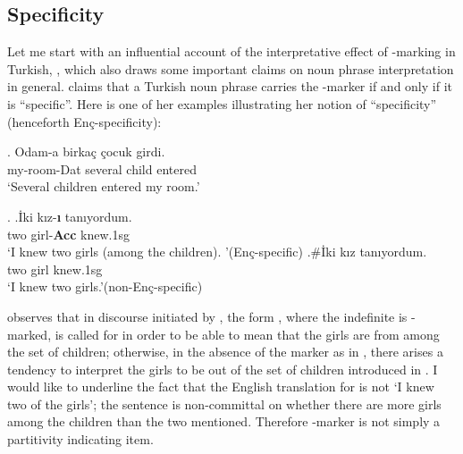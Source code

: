 \documentclass[11pt,a4paper]{article}
\newcommand{\encspec}{Enç-specific}
\begin{document}
\subsection{Specificity} %
\label{scenc}

Let me start with an influential account of the interpretative effect of \acc-marking in Turkish, , which also draws some important claims on noun phrase interpretation in general.   claims that a Turkish noun phrase carries the \acc-marker if and only if it is ``specific''. Here is one of her examples illustrating her notion of ``specificity'' (henceforth \encspec ity):

\exg.\label{Exencintro}%
{Odam-a}  {birka\c{c}} {\c{c}ocuk} {girdi.}\\
{my-room-Dat} {several}  {child}  {entered}\\
`Several children entered my room.'

\ex.\label{Exenc}
\ag.\label{Exenca}{\.Iki}  {k\i{}z-\textbf{\i}} {tan\i{}yordum}.\\
{two}  {girl-{\bf Acc}}  {knew.1sg}\\
`I knew two girls (among the children). '\hfill (\encspec)
\bg.\label{Exencz}\#{\.Iki}  {k\i{}z}  {tan\i{}yordum.} \\
{two}  {girl}  {knew.1sg}\\
`I knew two girls.'\hfill (non-\encspec)


 observes that in discourse initiated by , the form , where the indefinite  is \acc-marked, is called for in order to be able to mean that the girls are from among the set of children; otherwise, in the absence of the marker as in , there arises a tendency to interpret the girls to be out of the set of children introduced in . I would like to underline the fact that the English translation for  is not `I knew two of the girls'; the sentence is non-committal on whether there are more girls among the children than the two mentioned. Therefore \acc-marker is not simply a partitivity indicating item.
\end{document}
